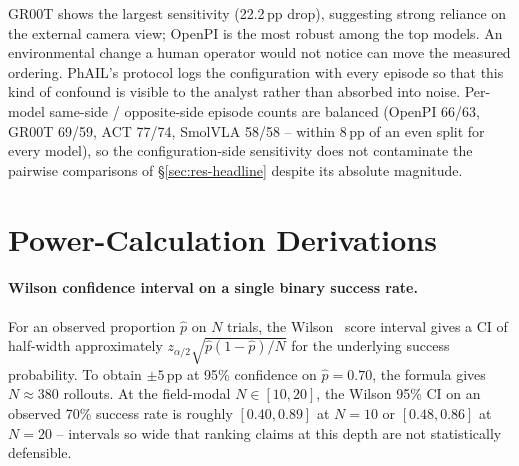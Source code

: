 \documentclass{article}
\begin{document}
GR00T shows the largest sensitivity (22.2\,pp drop), suggesting strong reliance on the external camera view; OpenPI is the most robust among the top models. An environmental change a human operator would not notice can move the measured ordering. PhAIL's protocol logs the configuration with every episode so that this kind of confound is visible to the analyst rather than absorbed into noise. Per-model same-side / opposite-side episode counts are balanced (OpenPI 66/63, GR00T 69/59, ACT 77/74, SmolVLA 58/58 -- within 8\,pp of an even split for every model), so the configuration-side sensitivity does not contaminate the pairwise comparisons of \S\ref{sec:res-headline} despite its absolute magnitude.

\section{Power-Calculation Derivations}\label{app:power}

\paragraph{Wilson confidence interval on a single binary success rate.} For an observed proportion $\hat{p}$ on $N$ trials, the Wilson~\cite{wilson1927} score interval gives a CI of half-width approximately $z_{\alpha/2}\sqrt{\hat{p}(1-\hat{p})/N}$ for the underlying success probability. To obtain $\pm 5$\,pp at 95\% confidence on $\hat{p} = 0.70$, the formula gives $N \approx 380$ rollouts. At the field-modal $N \in [10, 20]$, the Wilson 95\% CI on an observed 70\% success rate is roughly $[0.40, 0.89]$ at $N{=}10$ or $[0.48, 0.86]$ at $N{=}20$ -- intervals so wide that ranking claims at this depth are not statistically defensible.
\end{document}
